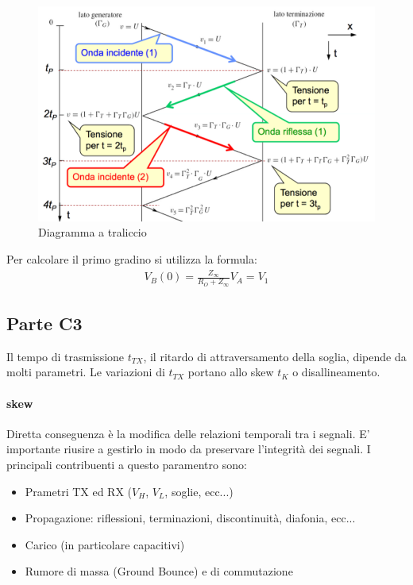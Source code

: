 \documentclass[12pt]{article}
\begin{document}
\begin{figure}[!hp]
  \includegraphics[width=\textwidth]{images/tralicc.png}
  \caption{Diagramma a traliccio}
  \label{fig:tralicc}
\end{figure}

Per calcolare il primo gradino si utilizza la formula:
\begin{equation}
  \begin{gathered}
    V_{B}(0)=\frac{Z_{\infty}}{R_{O}+Z_{\infty}}V_{A}=V_{1}
    \label{eq:veff}
  \end{gathered}
\end{equation}

\subsection{Parte C3}\label{c3} %
Il tempo di trasmissione $t_{TX}$, il ritardo di attraversamento della soglia, dipende da molti parametri. Le variazioni di $t_{TX}$ portano allo skew $t_{K}$ o disallineamento.

\paragraph{skew} Diretta conseguenza è la modifica delle relazioni temporali tra i segnali. E' importante riusire a gestirlo in modo da preservare l'integrità dei segnali. I principali contribuenti a questo paramentro sono:
\begin{itemize}
  \item Prametri TX ed RX ($V_{H}$, $V_{L}$, soglie, ecc...)
  \item Propagazione: riflessioni, terminazioni, discontinuità, diafonia, ecc...
  \item Carico (in particolare capacitivi)
  \item Rumore di massa (Ground Bounce) e di commutazione
\end{itemize} %
\end{document}

